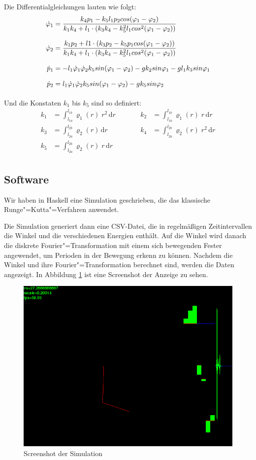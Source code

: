 \documentclass[a4paper, 10pt]{article}
\newcommand{\mathematik}{\begin{equation*}\begin{aligned}}
\newcommand{\mathematikstop}{\end{aligned}\end{equation*}}
\renewcommand{\phi}{\varphi} %
\renewcommand{\rho}{\varrho}
\newcommand{\phid}{\dot{\phi}}  %
\newcommand{\intend}{\,\mathrm{d}} %
\begin{document}
Die Differentialgleichungen lauten wie folgt:
\mathematik
\phid_1 &= \frac{k_4 p_1 - k_5 l_1 p_2 cos(\phi_1 - \phi_2)}{k_1 k_4 + l_1 \cdot (k_3 k_4 - k_5^2 l_1 cos^2(\phi_1 - \phi_2))} \\[0.5\baselineskip]
\phid_2 &= \frac{k_1 p_2 + l1 \cdot (k_3 p_2 - k_5 p_1 cos(\phi_1 - \phi_2))}{k_1 k_4 + l_1 \cdot (k_3 k_4 - k_5^2 l_1 cos^2(\phi_1 - \phi_2))} \\[0.5\baselineskip]
\dot{p}_1 &= -l_1 \phid_1 \phid_2 k_5 sin(\phi_1 - \phi_2) - g k_2 sin \phi_1 - g l_1 k_3 sin \phi_1 \\[0.5\baselineskip]
\dot{p}_2 &= l_1 \phid_1 \phid_2 k_5 sin(\phi_1 - \phi_2) - g k_5 sin \phi_2 \\[0.5\baselineskip]
\mathematikstop
Und die Konstaten $k_1$ bis $k_5$ sind so definiert:
\mathematik
k_1 &= \int^{l_{1b}}_{l_{1a}} \rho_1(r) \; r^2 \intend r
\qquad && k_2 &= \int^{l_{1b}}_{l_{1a}} \rho_1(r) \; r \intend r \\
k_3 &= \int^{l_{2b}}_{l_{2a}} \rho_2(r) \intend r
&& k_4 &= \int^{l_{2b}}_{l_{2a}} \rho_2(r) \; r^2 \intend r \\
k_5 &= \int^{l_{2b}}_{l_{2a}} \rho_2(r) \; r \intend r \\
\mathematikstop

\subsection{Software}
Wir haben in Haskell eine Simulation geschrieben, die das klassische Runge"=Kutta"=Verfahren anwendet.
\citep{wikirungekutta}

Die Simulation generiert dann eine CSV-Datei, die in regelmäßigen Zeitintervallen die Winkel und die verschiedenen Energien enthält.
Auf die Winkel wird danach die diskrete Fourier"=Transformation mit einem sich bewegenden Fester angewendet, um Perioden in der Bewegung erkenn zu können.
Nachdem die Winkel und ihre Fourier"=Transformation berechnet sind, werden die Daten angezeigt.
In Abbildung \ref{fig:hssim} ist eine Screenshot der Anzeige zu sehen.

\begin{figure}[bht]
  \includegraphics[width=\textwidth]{images/haskell_simulation_fwindow1000_cropped.png}
  \caption{Screenshot der Simulation}
  \label{fig:hssim}
\end{figure}
\end{document}
